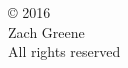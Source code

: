 
\thispagestyle{empty} %
\null\vfill %
\begin{center}
  \SingleSpace %
© 2016\\
Zach Greene\\
All rights reserved\\
\end{center}
